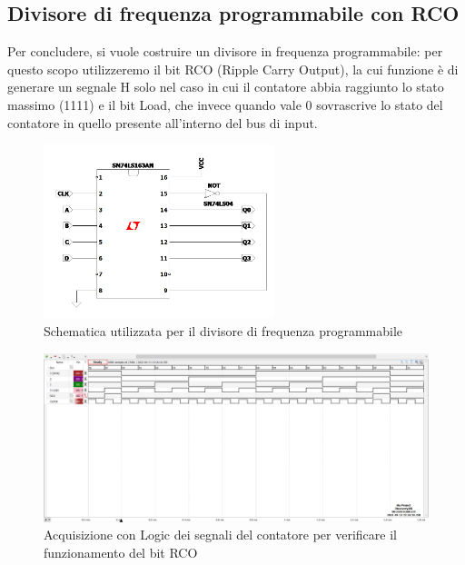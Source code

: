 \documentclass[10pt, a4paper, italian]{article}
\begin{document}
\subsection{Divisore di frequenza programmabile con RCO}
Per concludere, si vuole costruire un divisore in frequenza programmabile:
per questo scopo utilizzeremo il bit RCO (Ripple Carry Output), la cui funzione è di generare un segnale H solo nel caso in cui il contatore abbia raggiunto lo stato massimo (1111) e il bit Load, che invece quando vale 0 sovrascrive lo stato del contatore in quello presente all'interno del bus di input. 
\begin{figure}[htbp]
\centering
	\includegraphics[width=0.6\textwidth]{Draft2}
	\caption{Schematica utilizzata per il divisore di frequenza programmabile}
\end{figure}
\begin{figure}[htbp]
\centering
	\includegraphics[width=\textwidth]{5.RCO}
	\caption{Acquisizione con Logic dei segnali del contatore per verificare il funzionamento del bit RCO}
\end{figure}
\end{document}
